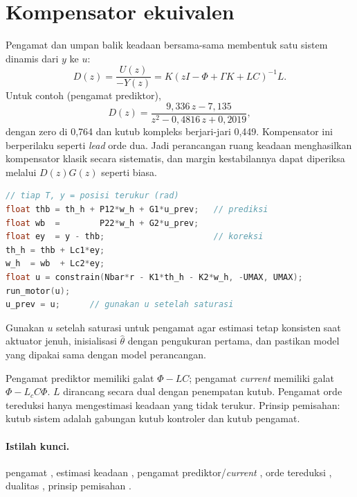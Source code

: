 \section{Kompensator ekuivalen}
Pengamat dan umpan balik keadaan bersama-sama membentuk satu sistem dinamis dari $y$ ke $u$:
\begin{equation}
	D(z) = \frac{U(z)}{-Y(z)} = K(zI - \Phi + \Gamma K + LC)^{-1}L.
\end{equation}
Untuk contoh (pengamat prediktor),
\[
	D(z) = \frac{9{,}336\,z - 7{,}135}{z^2 - 0{,}4816\,z + 0{,}2019},
\]
dengan zero di 0,764 dan kutub kompleks berjari-jari 0,449. Kompensator ini berperilaku seperti \textit{lead} orde dua. Jadi perancangan ruang keadaan menghasilkan kompensator klasik secara sistematis, dan margin kestabilannya dapat diperiksa melalui $D(z)G(z)$ seperti biasa.

\begin{lstlisting}[language=C++,caption={Pengamat \textit{current} dengan umpan balik keadaan},label={lst:b12-obs}]
// tiap T, y = posisi terukur (rad)
float thb = th_h + P12*w_h + G1*u_prev;   // prediksi
float wb  =        P22*w_h + G2*u_prev;
float ey  = y - thb;                      // koreksi
th_h = thb + Lc1*ey;
w_h  = wb  + Lc2*ey;
float u = constrain(Nbar*r - K1*th_h - K2*w_h, -UMAX, UMAX);
run_motor(u);
u_prev = u;      // gunakan u setelah saturasi
\end{lstlisting}

Gunakan $u$ setelah saturasi untuk pengamat agar estimasi tetap konsisten saat aktuator jenuh, inisialisasi $\hat\theta$ dengan pengukuran pertama, dan pastikan model yang dipakai sama dengan model perancangan.

\begin{ringkasan}
	Pengamat prediktor memiliki galat $\Phi - LC$; pengamat \textit{current} memiliki galat $\Phi - L_cC\Phi$. $L$ dirancang secara dual dengan penempatan kutub. Pengamat orde tereduksi hanya mengestimasi keadaan yang tidak terukur. Prinsip pemisahan: kutub sistem adalah gabungan kutub kontroler dan kutub pengamat.\\[3pt]
\end{ringkasan}

\paragraph{Istilah kunci.} pengamat , estimasi keadaan , pengamat prediktor/\textit{current} , orde tereduksi , dualitas , prinsip pemisahan .

